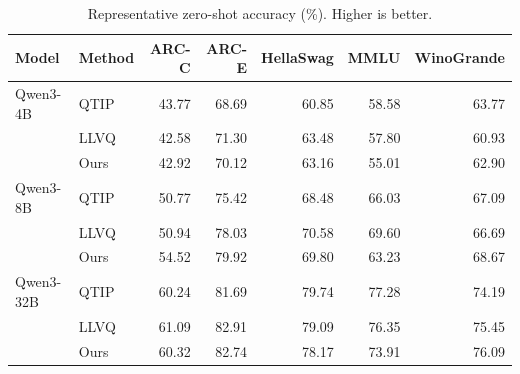 \begin{table}[t]\centering\small
\caption{Representative zero-shot accuracy (\%). Higher is better.}
\label{tab:downstream}
\begin{tabular}{llrrrrr}\toprule
Model & Method & ARC-C & ARC-E & HellaSwag & MMLU & WinoGrande\\\midrule
Qwen3-4B & QTIP & 43.77 & 68.69 & 60.85 & 58.58 & 63.77\\
 & LLVQ & 42.58 & 71.30 & 63.48 & 57.80 & 60.93\\
 & Ours & 42.92 & 70.12 & 63.16 & 55.01 & 62.90\\\midrule
Qwen3-8B & QTIP & 50.77 & 75.42 & 68.48 & 66.03 & 67.09\\
 & LLVQ & 50.94 & 78.03 & 70.58 & 69.60 & 66.69\\
 & Ours & 54.52 & 79.92 & 69.80 & 63.23 & 68.67\\\midrule
Qwen3-32B & QTIP & 60.24 & 81.69 & 79.74 & 77.28 & 74.19\\
 & LLVQ & 61.09 & 82.91 & 79.09 & 76.35 & 75.45\\
 & Ours & 60.32 & 82.74 & 78.17 & 73.91 & 76.09\\\bottomrule
\end{tabular}\end{table}
